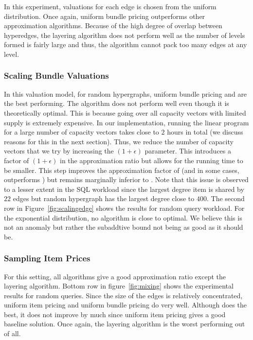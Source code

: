 In this experiment, valuations for each edge is chosen from the uniform distribution. Once again, uniform bundle pricing outperforms other approximation algorithms. Because of the high degree of overlap between hyperedges, the layering algorithm does not perform well as the number of levels formed is fairly large and thus, the algorithm cannot pack too many edges at any level.

\subsubsection{Scaling Bundle Valuations} In this valuation model, for random hypergraphs, uniform bundle pricing and \lpip are the best performing. The \cip algorithm does not perform well even though it is theoretically optimal. This is because going over all capacity vectors with limited supply is extremely expensive. In our implementation, running the linear program for a large number of capacity vectors takes close to $2$ hours in total (we discuss reasons for this in the next section). Thus, we reduce the number of capacity vectors that we try by increasing the $(1+\epsilon)$ parameter. This introduces a factor of $(1+\epsilon)$ in the approximation ratio but allows for the running time to be smaller. This step improves the approximation factor of \cip (and in some cases, outperforms \lpip) but remains marginally inferior to \lpip . Note that this issue is observed to a lesser extent in the SQL workload since the largest degree item is shared by $22$ edges but random hypergraph has the largest degree close to $400$. The second row in Figure~\ref{fig:scalingedge} shows the results for random query workload. For the exponential distribution, no algorithm is close to optimal. We believe this is not an anomaly but rather the subaddtive bound not being as good as it should be.

\subsubsection{Sampling Item Prices} For this setting, all algorithms give a good approximation ratio except the layering algorithm. Bottom row in figure~\ref*{fig:mixing} shows the experimental results for random queries. Since the size of the edges is relatively concentrated, uniform item pricing and uniform bundle pricing do very well. Although \lpip does the best, it does not improve by much since uniform item pricing gives a good baseline solution.  Once again, the layering algorithm is the worst performing out of all.


